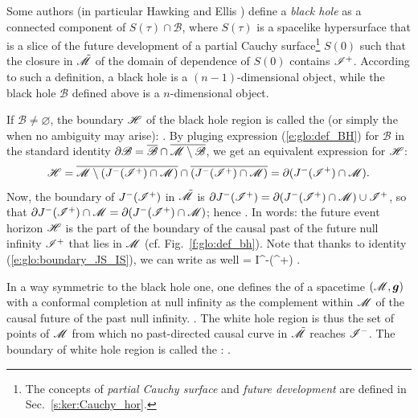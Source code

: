 \begin{remark}
Some authors (in particular Hawking and Ellis \cite{HawkiE73}) define a
\emph{black hole} as a connected component of
$S(\tau) \cap \mathscr{B}$, where $S(\tau)$ is a spacelike
hypersurface that is a slice of the future development of a partial
Cauchy surface\footnote{The concepts of \emph{partial Cauchy surface}
and \emph{future development} are defined in Sec.~\ref{s:ker:Cauchy_hor}.} $S(0)$ such that the
closure in $\tilde{\mathscr{M}}$ of the domain of dependence of $S(0)$ contains $\mathscr{I}^+$.
According to such a definition, a black hole is a $(n-1)$-dimensional object,
while the black hole $\mathscr{B}$ defined above is a $n$-dimensional object.
\end{remark}

If $\mathscr{B}\not=\varnothing$, the boundary $\mathscr{H}$ of the black hole region
is called the 
(or simply the 
when no ambiguity may arise):
\be
    .
\ee
By pluging expression (\ref{e:glo:def_BH}) for $\mathscr{B}$ in the standard
identity $\partial \mathscr{B} =
\overline{\mathscr{B}} \cap \overline{\mathscr{M}\setminus \mathscr{B}}$, we get
an equivalent expression for $\mathscr{H}$:
\[
    \mathscr{H} = \overline{\mathscr{M} \setminus (J^-(\mathscr{I}^+)\cap\mathscr{M})} \cap
        \overline{(J^-(\mathscr{I}^+)\cap\mathscr{M})}
        = \partial(J^-(\mathscr{I}^+)\cap\mathscr{M}) .
\]
Now, the boundary of $J^-(\mathscr{I}^+)$ in $\tilde{\mathscr{M}}$ is
$\partial J^-(\mathscr{I}^+) = \partial (J^-(\mathscr{I}^+)\cap\mathscr{M}) \cup \mathscr{I}^+$, so that
$\partial J^-(\mathscr{I}^+) \cap \mathscr{M} =  \partial(J^-(\mathscr{I}^+)\cap\mathscr{M})$; hence
\be
    .
\ee
In words: the future event horizon $\mathscr{H}$ is the part of the boundary of the causal past
of the future null infinity $\mathscr{I}^+$ that lies in $\mathscr{M}$ (cf. Fig.~\ref{f:glo:def_bh}).
Note that thanks to identity (\ref{e:glo:boundary_JS_IS}), we can write as
well
\be
    \Hor = \partial I^-(\scri^+) \cap \M .
\ee

In a way symmetric to the black hole one, one defines
the  of a
spacetime $(\mathscr{M},\bm{g})$ with a conformal completion at null infinity as the
complement within $\mathscr{M}$ of the causal future of the past null infinity.
\be \label{e:glo:def_white_hole}
     .
\ee
The white hole region is thus the set of points of $\mathscr{M}$
from which no past-directed causal curve in $\tilde{\mathscr{M}}$ reaches $\mathscr{I}^-$.
The boundary of white hole region is called the
:
\be
     .
\ee


